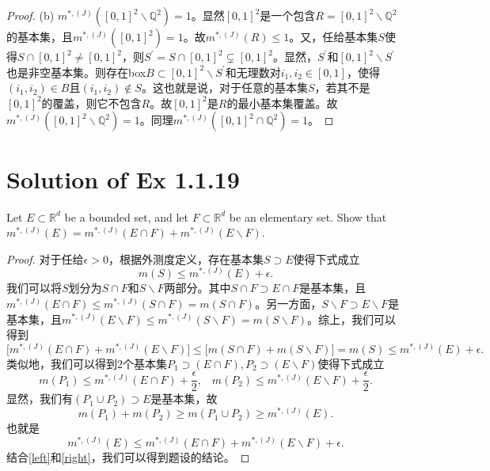 \documentclass[reqno,a4paper,14pt]{amsart}
\begin{document}
\begin{proof}
    \newline
    (b) $m^{*,(J)}([0,1]^2\backslash \mathbb{Q}^2)=1$。显然$[0,1]^2$是一个包含$R=[0,1]^2\backslash \mathbb{Q}^2$的基本集，且$m^{*,(J)}([0,1]^2)=1$。故$m^{*,(J)}(R)\leq 1$。又，任给基本集$S$使得$S\cap [0,1]^2\neq [0,1]^2$，则$S^\prime=S\cap [0,1]^2\subsetneq [0,1]^2$。显然，$S^\prime$和$[0,1]^2\backslash S^\prime$也是非空基本集。则存在box$B\subset [0,1]^2\backslash S^\prime$和无理数对$i_1,i_2\in [0,1]$，使得$(i_1,i_2)\in B$且$(i_1,i_2)\notin S$。这也就是说，对于任意的基本集$S$，若其不是$[0,1]^2$的覆盖，则它不包含$R$。故$[0,1]^2$是$R$的最小基本集覆盖。故$m^{*,(J)}([0,1]^2\backslash \mathbb{Q}^2)=1$。同理$m^{*,(J)}([0,1]^2\cap \mathbb{Q}^2)=1$。
\end{proof}

\section{Solution of Ex 1.1.19}
Let $E\subset \mathbb{R}^d$ be a bounded set, and let $F\subset \mathbb{R}^d$ be an elementary set. Show that $m^{*,(J)}(E)=m^{*,(J)}(E\cap F)+m^{*,(J)}(E\backslash F)$.\\
\begin{proof}
    对于任给$\epsilon>0$，根据外测度定义，存在基本集$S\supset E$使得下式成立
    \begin{equation*}
        m(S)\leq m^{*,(J)}(E)+\epsilon.
    \end{equation*}
    我们可以将$S$划分为$S\cap F$和$S\backslash F$两部分。其中$S\cap F\supset E\cap F$是基本集，且$m^{*,(J)}(E\cap F)\leq m^{*,(J)}(S\cap F)=m(S\cap F)$。另一方面，$S\backslash F\supset E\backslash F$是基本集，且$m^{*,(J)}(E\backslash F)\leq m^{*,(J)}(S\backslash F)=m(S\backslash F)$。综上，我们可以得到
    \begin{equation}
        \biggl[m^{*,(J)}(E\cap F)+m^{*,(J)}(E\backslash F)\biggr]\leq \biggl[m(S\cap F)+m(S\backslash F)\biggr]=m(S)\leq m^{*,(J)}(E)+\epsilon.
        \label{right}
    \end{equation}
    类似地，我们可以得到2个基本集$P_1\supset (E\cap F),P_2\supset (E\backslash F)$使得下式成立
    \begin{equation*}
        m(P_1)\leq m^{*,(J)}(E\cap F)+\frac{\epsilon}{2},\;\;\; m(P_2)\leq m^{*,(J)}(E\backslash F)+\frac{\epsilon}{2}.
    \end{equation*}
    显然，我们有$(P_1\cup P_2)\supset E$是基本集，故
    \begin{equation*}
        m(P_1)+m(P_2)\geq m(P_1\cup P_2)\geq m^{*,(J)}(E).
    \end{equation*}
    也就是
    \begin{equation}
        m^{*,(J)}(E)\leq m^{*,(J)}(E\cap F)+m^{*,(J)}(E\backslash F)+\epsilon.
        \label{left}
    \end{equation}
    结合\eqref{left}和\eqref{right}，我们可以得到题设的结论。
\end{proof}
\end{document}
